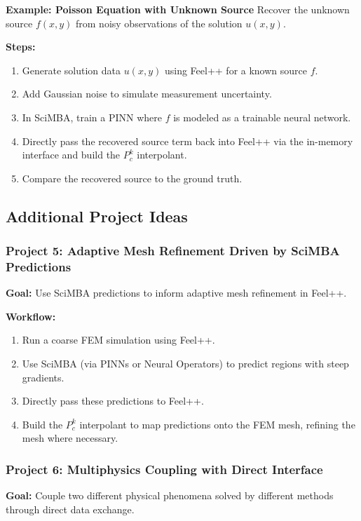 \documentclass[11pt]{article}
\begin{document}
\textbf{Example: Poisson Equation with Unknown Source}  
Recover the unknown source \( f(x,y) \) from noisy observations of the solution \( u(x,y) \).

\textbf{Steps:}
\begin{enumerate}[label=\arabic*.]
    \item Generate solution data \( u(x,y) \) using Feel++ for a known source \( f \).
    \item Add Gaussian noise to simulate measurement uncertainty.
    \item In SciMBA, train a PINN where \( f \) is modeled as a trainable neural network.
    \item Directly pass the recovered source term back into Feel++ via the in-memory interface and build the \( P_c^k \) interpolant.
    \item Compare the recovered source to the ground truth.
\end{enumerate}

\subsection{Additional Project Ideas}

\subsubsection*{Project 5: Adaptive Mesh Refinement Driven by SciMBA Predictions}
\textbf{Goal:}  
Use SciMBA predictions to inform adaptive mesh refinement in Feel++.

\textbf{Workflow:}
\begin{enumerate}[label=\arabic*.]
    \item Run a coarse FEM simulation using Feel++.
    \item Use SciMBA (via PINNs or Neural Operators) to predict regions with steep gradients.
    \item Directly pass these predictions to Feel++.
    \item Build the \( P_c^k \) interpolant to map predictions onto the FEM mesh, refining the mesh where necessary.
\end{enumerate}

\subsubsection*{Project 6: Multiphysics Coupling with Direct Interface}
\textbf{Goal:}  
Couple two different physical phenomena solved by different methods through direct data exchange.
\end{document}
